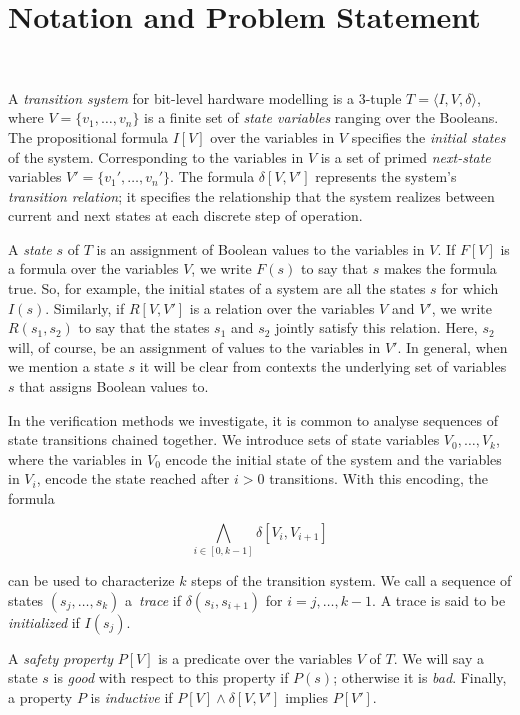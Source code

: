 \section{Notation and Problem Statement}~\label{sec:notation}

A \textit{transition system} for bit-level hardware
modelling is a 3-tuple $T = \langle I,V,\delta \rangle$, where $V = \{v_1,\dots ,v_n\}$
is a finite set of \textit{state variables} ranging over the Booleans.
The propositional formula $I[V]$ over the variables in 
$V$ specifies the \textit{initial states} of the system. 
Corresponding to the variables in $V$ is a set of primed \textit{next-state} variables $V' = \{v_1', \dots, v_n'\}$.
The formula $\delta[V,V']$ represents the system's \textit{transition relation}; it specifies the relationship that the system realizes between current and next states at each discrete step of operation.

A \textit{state} $s$ of $T$ is an assignment of Boolean values to the variables in $V$.
If $F[V]$ is a formula over the variables $V$, we write $F(s)$ to say that $s$ makes the formula true.
So, for example, the initial states of a system are all the states $s$ for which $I(s)$. Similarly, if $R[V,V']$ is a relation over the variables $V$ and $V'$, we write $R(s_1,s_2)$ to say that the states $s_1$ and $s_2$ jointly satisfy this relation. Here, $s_2$ will, of course, be an assignment of values to the variables in $V'$. In general, when we mention a state $s$
it will be clear from contexts the underlying set of variables $s$ that assigns Boolean values to.

In the verification methods we investigate, it is common to analyse sequences of state transitions chained together.
We introduce sets of state variables $V_0, \dots, V_k$, where the variables in $V_0$ encode the initial state of the system and the variables in $V_i$, encode the state reached after $i>0$ transitions. With this encoding, the formula

\[ \underset{i \in [0,k-1]}{\bigwedge} \delta[V_i, V_{i+1}]\] 

\noindent can be used to characterize $k$ steps of the transition system.
We call a sequence of states $(s_j,\dots,s_k)$ a~\textit{trace}
if $\delta(s_i,s_{i{+}1})$ for $i=j,\dots,k-1$.  A trace is
said to be \textit{initialized} if $I(s_j)$.
  
A \textit{safety property} $P[V]$ is a predicate over the variables $V$ of $T$.  We will
say a state $s$ is \textit{good} with respect to this property if $P(s)$; otherwise it is \textit{bad}.
Finally, a property $P$ is \textit{inductive} if $P[V] \wedge \delta[V,V']$ implies $P[V']$.

